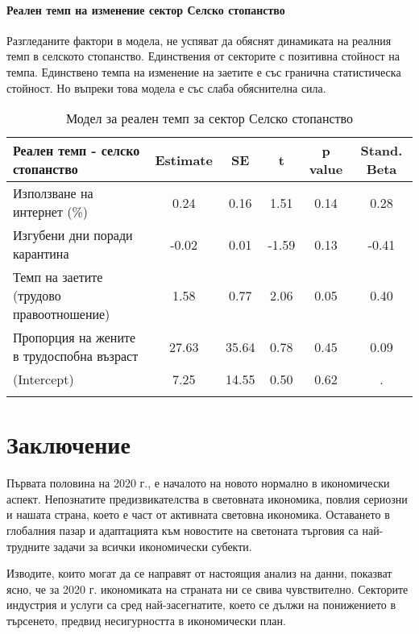 \documentclass[a4paper,12pt]{article}
\begin{document}
\paragraph{Реален темп на изменение сектор Селско стопанство}

Разгледаните фактори в модела, не успяват да обяснят динамиката на реалния темп в селското стопанство. Единствения от секторите с позитивна стойност на темпа. Единствено темпа на изменение на заетите е със гранична статистическа стойност. Но въпреки това модела е със слаба обяснителна сила. 
\begin{table}[htbp]
	\centering
	\caption{Модел за реален темп за сектор Селско стопанство}
	\begin{tabular}{rccccc}
		\toprule
		\multicolumn{1}{l}{Реален темп - селско стопанство} & Estimate & SE    & t     & p value & Stand. Beta \\
		\midrule
		\multicolumn{1}{l}{Използване на интернет (\%)} & 0.24  & 0.16  & 1.51  & 0.14  & 0.28 \\
		\multicolumn{1}{l}{Изгубени дни поради карантина } & -0.02 & 0.01  & -1.59 & 0.13  & -0.41 \\
		\multicolumn{1}{l}{Темп на заетите (трудово правоотношение)} & 1.58  & 0.77  & 2.06  & 0.05  & 0.40 \\
		\multicolumn{1}{l}{Пропорция на жените в трудоспобна възраст } & 27.63 & 35.64 & 0.78  & 0.45  & 0.09 \\
		\multicolumn{1}{l}{(Intercept)} & 7.25  & 14.55 & 0.50  & 0.62  & . \\
		\midrule
		&       &       &       &       &  \\
	\end{tabular}%
	\label{tab:addlabel}%
\end{table}%


\section{Заключение}
Първата половина на 2020 г., е началото на новото нормално в икономически аспект. Непознатите предизвикателства в световната икономика, повлия сериозни и нашата страна, което е част от активната световна икономика. Оставането в глобалния пазар и адаптацията към новостите на светоната търговия са най-трудните задачи за всички икономически субекти.

Изводите, които могат да се направят от настоящия анализ на данни, показват ясно, че за 2020 г. икономиката на страната ни се свива чувствително. Секторите индустрия и услуги са сред най-засегнатите, което се дължи на понижението в търсенето, предвид несигурността в икономически план. 
\end{document}
